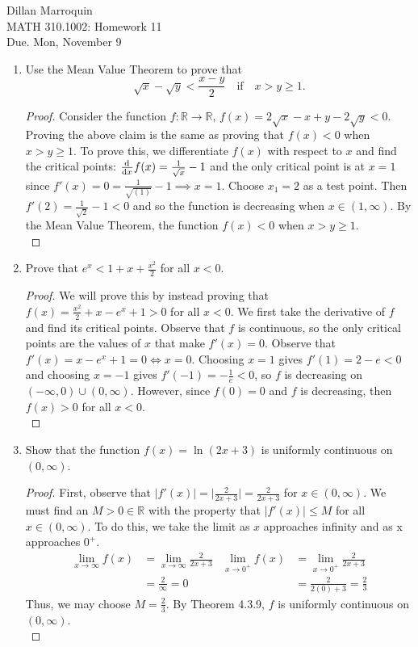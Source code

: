 \documentclass{article}
\begin{document}
    \noindent Dillan Marroquin\\ MATH 310.1002: Homework 11\\
    Due. Mon, November 9

    \begin{enumerate}
        \item Use the Mean Value Theorem to prove that
            \[\sqrt{x}-\sqrt{y} < \frac{x-y}{2} \quad \text{if} \quad x > y \geq 1.\]
        \begin{proof}
            Consider the function $f:\mathbb{R \to \mathbb{R}}, \, f(x) = 2\sqrt{x}-x+y-2\sqrt{y} < 0$. Proving the above claim is the same as proving that $f(x) < 0$ when $x>y\geq1$. To prove this, we differentiate $f(x)$ with respect to $x$ and find the critical points: $\od{}{x} f(x) = \frac{1}{\sqrt{x}}-1$ and the only critical point is at $x=1$ since $f'(x) = 0 =  \frac{1}{\sqrt{(1)}} - 1  \implies x=1$. Choose $x_1=2$ as a test point. Then $f'(2) = \frac{1}{\sqrt{2}} -1< 0$ and so the function is decreasing when $x \in (1, \infty)$. By the Mean Value Theorem, the function $f(x) < 0$ when $x > y \geq 1$.\\
        \end{proof}
        
        \item Prove that $e^x < 1+x+ \frac{x^2}{2}$ for all $x < 0$.
        \begin{proof}
            We will prove this by instead proving that $f(x) = \frac{x^2}{2}+x-e^x+1 > 0$ for all $x < 0$. We first take the derivative of $f$ and find its critical points. Observe that $f$ is continuous, so the only critical points are the values of $x$ that make $f'(x) = 0$. Observe that $f'(x) = x-e^x+1 = 0 \iff x=0$. Choosing $x=1$ gives $f'(1) = 2-e < 0$ and choosing $x=-1$ gives $f'(-1) = -\frac{1}{e} < 0$, so $f$ is decreasing on $(-\infty,0) \cup (0, \infty)$. However, since $f(0) = 0$ and $f$ is decreasing, then $f(x) > 0$ for all $x < 0$.\\
        \end{proof}
        
        \item Show that the function $f(x) = \ln{(2x+3)}$ is uniformly continuous on $(0, \infty)$.
        \begin{proof}
            First, observe that $|f'(x)| = \Big|\frac{2}{2x+3}\Big| = \frac{2}{2x+3}$ for $x \in (0, \infty)$. We must find an $M>0 \in \mathbb{R}$ with the property that $|f'(x)| \leq M$ for all $x \in (0, \infty)$. To do this, we take the limit as $x$ approaches infinity and as x approaches $0^+$.
                \begin{align*}
                    \lim_{x \to \infty} f(x) &= \lim_{x \to \infty} \frac{2}{2x+3}   &  \lim_{x \to 0^+} f(x) &= \lim_{x \to 0^+} \frac{2}{2x+3}\\
                    &= \frac{2}{\infty} = 0     &       &= \frac{2}{2(0)+3} = \frac{2}{3}
                \end{align*}
            Thus, we may choose $M = \frac{2}{3}$. By Theorem 4.3.9, $f$ is uniformly continuous on $(0, \infty)$.\\
        \end{proof}
        

\end{enumerate}
\end{document}
